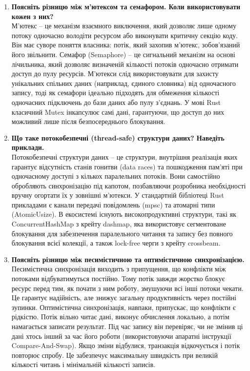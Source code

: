 \documentclass[14pt, a4paper]{extreport}
\begin{document}
	\begin{enumerate}
		\item \textbf{Поясніть різницю між м'ютексом та семафором. Коли використовувати кожен з них?} \\ М'ютекс -- це механізм взаємного виключення, який дозволяє лише одному потоку одночасно володіти ресурсом або виконувати критичну секцію коду. Він має суворе поняття власника: потік, який захопив м'ютекс, зобов'язаний його звільнити. 
		Семафор (Semaphore) -- це сигнальний механізм на основі лічильника, який дозволяє визначеній кількості потоків одночасно отримати доступ до пулу ресурсів. М'ютекси слід використовувати для захисту унікальних спільних даних (наприклад, єдиного словника) від одночасного запису, тоді як семафори ідеально підходять для обмеження кількості одночасних підключень до бази даних або пулу з'єднань. У мові Rust класичний Mutex інкапсулює самі дані, гарантуючи, що доступ до них можливий лише після безпосереднього блокування.
		
		\item \textbf{Що таке потокобезпечні (thread-safe) структури даних? Наведіть приклади.} \\ Потокобезпечні структури даних -- це структури, внутрішня реалізація яких гарантує відсутність станів гонитви (data races) та пошкодження пам'яті при одночасному доступі з кількох паралельних потоків. Вони самостійно обробляють синхронізацію під капотом, позбавляючи розробника необхідності вручну огортати їх у зовнішні м'ютекси. У стандартній бібліотеці Rust прикладами є канали передачі повідомлень (mpsc) та атомарні типи (AtomicUsize). В екосистемі існують високопродуктивні структури, такі як ConcurrentHashMap з крейту dashmap, яка використовує сегментоване блокування для забезпечення паралельного читання та запису без повного блокування всієї колекції, а також lock-free черги з крейту crossbeam.
		
		\item \textbf{Поясніть різницю між песимістичною та оптимістичною синхронізацією.} \\ Песимістична синхронізація виходить з припущення, що конфлікти між потоками відбуватимуться постійно. Тому потік завжди жорстко блокує ресурс перед тим, як почати з ним роботу, змушуючи всі інші потоки чекати. Це гарантує надійність, але знижує загальну продуктивність через постійні зупинки. Оптимістична синхронізація, навпаки, припускає, що конфлікти є рідкістю. Потік вільно читає дані, виконує обчислення локально, а потім намагається записати результат. Під час запису він перевіряє, чи не змінив ці дані хтось інший за час його роботи (використовуючи апаратні інструкції Compare-And-Swap). Якщо зміни відбулися, транзакція відкочується і потік повторює спробу. Це забезпечує максимальну швидкість при великій кількості читань і мінімальній кількості записів.
		

\end{enumerate}
\end{document}
